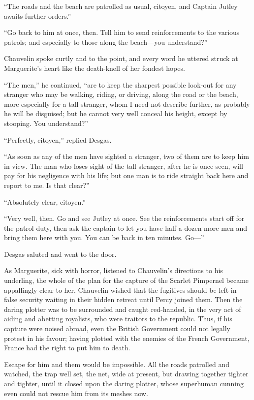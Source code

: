 \documentclass[paper=5.5in:8.5in,BCOR=7mm,twoside,DIV=calc,12pt,usegeometry,chapterprefix,endperiod,headings=big]{scrbook}
\begin{document}
\enquote{The roads and the beach are patrolled as usual, citoyen, and Captain Jutley awaits further orders.}

\enquote{Go back to him at once, then. Tell him to send reinforcements to the various patrols; and especially to those along the beach---you understand?}

Chauvelin spoke curtly and to the point, and every word he uttered struck at Marguerite's heart like the death-knell of her fondest hopes.

\enquote{The men,} he continued, \enquote{are to keep the sharpest possible look-out for any stranger who may be walking, riding, or driving, along the road or the beach, more especially for a tall stranger, whom I need not describe further, as probably he will be disguised; but he cannot very well conceal his height, except by stooping. You understand?}

\enquote{Perfectly, citoyen,} replied Desgas.

\enquote{As soon as any of the men have sighted a stranger, two of them are to keep him in view. The man who loses sight of the tall stranger, after he is once seen, will pay for his negligence with his life; but one man is to ride straight back here and report to me. Is that clear?}

\enquote{Absolutely clear, citoyen.}

\enquote{Very well, then. Go and see Jutley at once. See the reinforcements start off for the patrol duty, then ask the captain to let you have half-a-dozen more men and bring them here with you. You can be back in ten minutes. Go---}

Desgas saluted and went to the door.

As Marguerite, sick with horror, listened to Chauvelin's directions to his underling, the whole of the plan for the capture of the Scarlet Pimpernel became appallingly clear to her. Chauvelin wished that the fugitives should be left in false security waiting in their hidden retreat until Percy joined them. Then the daring plotter was to be surrounded and caught red-handed, in the very act of aiding and abetting royalists, who were traitors to the republic. Thus, if his capture were noised abroad, even the British Government could not legally protest in his favour; having plotted with the enemies of the French Government, France had the right to put him to death.

Escape for him and them would be impossible. All the roads patrolled and watched, the trap well set, the net, wide at present, but drawing together tighter and tighter, until it closed upon the daring plotter, whose superhuman cunning even could not rescue him from its meshes now.
\end{document}
